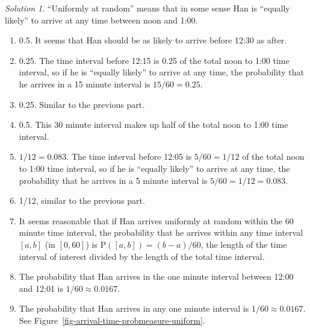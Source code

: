 \documentclass[
  letterpaper,
  DIV=11,
  numbers=noendperiod]{scrreprt}
\providecommand{\tightlist}{%
  \setlength{\itemsep}{0pt}\setlength{\parskip}{0pt}}
\theoremstyle{plain}
\theoremstyle{definition}
\theoremstyle{definition}
\theoremstyle{definition}
\theoremstyle{remark}
\newtheorem{refsolution}{Solution}[chapter]
\begin{document}

\begin{tcolorbox}[enhanced jigsaw, opacityback=0, rightrule=.15mm, coltitle=black, colframe=quarto-callout-tip-color-frame, toprule=.15mm, colbacktitle=quarto-callout-tip-color!10!white, opacitybacktitle=0.6, left=2mm, toptitle=1mm, breakable, title={Solution (click to expand)}, bottomtitle=1mm, colback=white, leftrule=.75mm, titlerule=0mm, arc=.35mm, bottomrule=.15mm]

\begin{refsolution}
``Uniformly at random'' means that in some sense Han is ``equally
likely'' to arrive at any time between noon and 1:00.

\begin{enumerate}
\def\labelenumi{\arabic{enumi}.}
\tightlist
\item
  0.5. It seems that Han should be as likely to arrive before 12:30 as
  after.
\item
  0.25. The time interval before 12:15 is 0.25 of the total noon to 1:00
  time interval, so if he is ``equally likely'' to arrive at any time,
  the probability that he arrives in a 15 minute interval is
  \(15/60 = 0.25\).
\item
  0.25. Similar to the previous part.
\item
  0.5. This 30 minute interval makes up half of the total noon to 1:00
  time interval.
\item
  \(1/12 = 0.083\). The time interval before 12:05 is \(5/60=1/12\) of
  the total noon to 1:00 time interval, so if he is ``equally likely''
  to arrive at any time, the probability that he arrives in a 5 minute
  interval is \(5/60 = 1/12=0.083\).
\item
  1/12, similar to the previous part.
\item
  It seems reasonable that if Han arrives uniformly at random within the
  60 minute time interval, the probability that he arrives within any
  time interval \([a, b]\) (in \([0, 60]\)) is
  \(\textrm{P}([a, b]) = (b-a)/60\), the length of the time interval of
  interest divided by the length of the total time interval.
\item
  The probability that Han arrives in the one minute interval between
  12:00 and 12:01 is \(1/60\approx 0.0167\).
\item
  The probability that Han arrives in any one minute interval is
  \(1/60\approx 0.0167\). See
  Figure~\ref{fig-arrival-time-probmeasure-uniform}.
\end{enumerate}

\label{sol-meeting-probspace1d-uniform}

\end{refsolution}

\end{tcolorbox}
\end{document}
